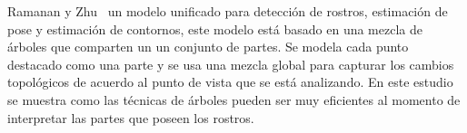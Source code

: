 Ramanan y Zhu~\cite{Zhu2012} un modelo unificado para detección de rostros, estimación de pose y estimación de contornos, este modelo está basado en una mezcla de árboles que comparten un un conjunto de partes. Se modela cada punto destacado como una parte y se usa una mezcla global para capturar los cambios topológicos de acuerdo al punto de vista que se está analizando. En este estudio se muestra como las técnicas de árboles pueden ser muy eficientes al momento de interpretar las partes que poseen los rostros.


